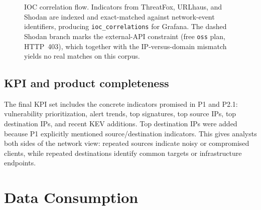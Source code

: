 \documentclass[11pt,a4paper]{article}
\newcommand{\code}[1]{\nolinkurl{#1}}
\begin{document}
\begin{figure}[H]
  \centering
  \caption{IOC correlation flow. Indicators from ThreatFox, URLhaus, and Shodan are indexed and exact-matched against network-event identifiers, producing \code{ioc_correlations} for Grafana. The dashed Shodan branch marks the external-API constraint (free \code{oss} plan, HTTP~403), which together with the IP-versus-domain mismatch yields no real matches on this corpus.}
\end{figure}

\subsection{KPI and product completeness}

The final KPI set includes the concrete indicators promised in P1 and P2.1: vulnerability prioritization, alert trends, top signatures, top source IPs, top destination IPs, and recent KEV additions. Top destination IPs were added because P1 explicitly mentioned source/destination indicators. This gives analysts both sides of the network view: repeated sources indicate noisy or compromised clients, while repeated destinations identify common targets or infrastructure endpoints.

\section{Data Consumption}
\end{document}
